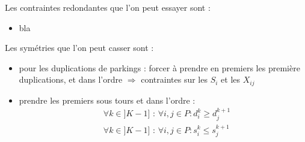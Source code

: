 \documentclass[12pt,a4paper,fleqn]{article}
\begin{document}
\clearpage

Les contraintes redondantes que l'on peut essayer sont :
\begin{itemize}
\item bla
\end{itemize}


Les symétries que l'on peut casser sont :
\begin{itemize}
\item pour les duplications de parkings : forcer à prendre en premiers les première duplications, et dans l'ordre $\Rightarrow$ contraintes sur les $S_i$ et les $X_{ij}$
\item prendre les premiers sous tours et dans l'ordre :
\begin{align}
& \forall k \in ]K-1] \text{ : } \forall i,j \in P : d^k_i \geqslant d^{k+1}_j \label{symetriesoustours1} \\
& \forall k \in ]K-1] \text{ : } \forall i,j \in P : s^k_i \leqslant s^{k+1}_j \label{symetriesoustours2}
\end{align}
\end{itemize}
\end{document}
